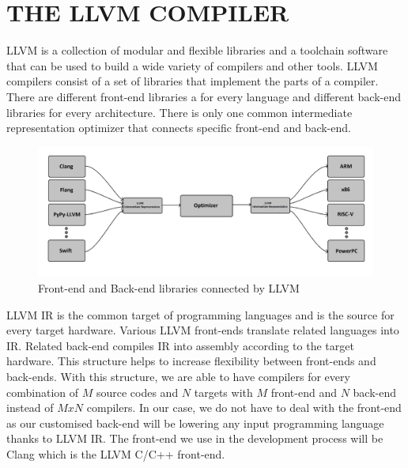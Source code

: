 \clearpage
\chapter{THE LLVM COMPILER}\label{ch:Ch3}

LLVM is a collection of modular and flexible libraries and a toolchain software that can be used to build a wide variety of compilers and other tools. LLVM compilers consist of a set of libraries that implement the parts of a compiler. There are different front-end libraries a for every language and different back-end libraries for every architecture. There is only one common intermediate representation optimizer that connects specific front-end and back-end.

\begin{figure}
    \centering
    \includegraphics[scale = 0.8]{the_llvm_compiler/llvm_diagram.png}
    \caption{Front-end and Back-end libraries connected by LLVM}
    \label{fig:llvm_diagram}
\end{figure}

LLVM IR is the common target of programming languages and is the source for every target hardware. Various LLVM front-ends translate related languages into IR. Related back-end compiles IR into assembly according to the target hardware. This structure helps to increase flexibility between front-ends and back-ends. With this structure, we are able to have compilers for every combination of $M$ source codes and $N$ targets with $M$ front-end and $N$ back-end instead of $MxN$ compilers. In our case, we do not have to deal with the front-end as our customised back-end will be lowering any input programming language thanks to LLVM IR. The front-end we use in the development process will be Clang which is the LLVM C/C++ front-end\cite{clang}.

